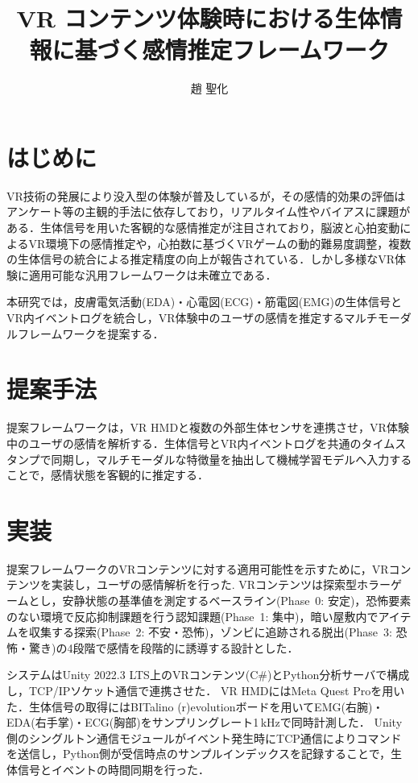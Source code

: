 \documentclass[paper=a4paper,fontsize=10pt,jafontscale=0.925,twocolumn]{jlreq}
\title{VR コンテンツ体験時における生体情報に基づく感情推定フレームワーク} %
\affiliation{人間システム工学科 井村研究室} %
\author{趙 聖化} %
\begin{document}
\maketitle

\section{はじめに}
VR技術の発展により没入型の体験が普及しているが，その感情的効果の評価はアンケート等の主観的手法に依存しており，リアルタイム性やバイアスに課題がある．生体信号を用いた客観的な感情推定が注目されており，脳波と心拍変動によるVR環境下の感情推定\cite{MarinMorales2018}や，心拍数に基づくVRゲームの動的難易度調整\cite{OrozcoMora2024}，複数の生体信号の統合による推定精度の向上\cite{MarinMorales2020}が報告されている．しかし多様なVR体験に適用可能な汎用フレームワークは未確立である．

本研究では，皮膚電気活動(EDA)・心電図(ECG)・筋電図(EMG)の生体信号とVR内イベントログを統合し，VR体験中のユーザの感情を推定するマルチモーダルフレームワークを提案する．

\section{提案手法}
提案フレームワークは，VR HMDと複数の外部生体センサを連携させ，VR体験中のユーザの感情を解析する．生体信号とVR内イベントログを共通のタイムスタンプで同期し，マルチモーダルな特徴量を抽出して機械学習モデルへ入力することで，感情状態を客観的に推定する．

\section{実装}
提案フレームワークのVRコンテンツに対する適用可能性を示すために，VRコンテンツを実装し，ユーザの感情解析を行った.
VRコンテンツは探索型ホラーゲームとし，安静状態の基準値を測定するベースライン(Phase~0: 安定)，恐怖要素のない環境で反応抑制課題を行う認知課題(Phase~1: 集中)，暗い屋敷内でアイテムを収集する探索(Phase~2: 不安・恐怖)，ゾンビに追跡される脱出(Phase~3: 恐怖・驚き)の4段階で感情を段階的に誘導する設計とした．

システムはUnity 2022.3 LTS上のVRコンテンツ(C\#)とPython分析サーバで構成し，TCP/IPソケット通信で連携させた．
VR HMDにはMeta Quest Proを用いた．生体信号の取得にはBITalino (r)evolutionボードを用いてEMG(右腕)・EDA(右手掌)・ECG(胸部)をサンプリングレート1\,kHzで同時計測した．
Unity側のシングルトン通信モジュールがイベント発生時にTCP通信によりコマンドを送信し，Python側が受信時点のサンプルインデックスを記録することで，生体信号とイベントの時間同期を行った．
\end{document}
